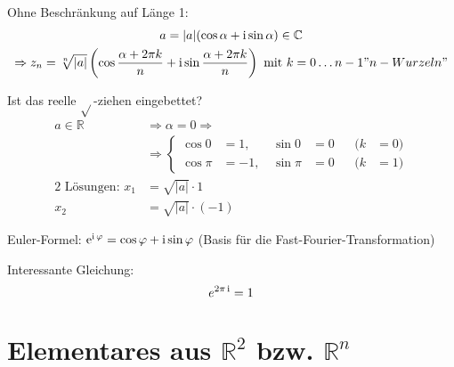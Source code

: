Ohne Beschränkung auf Länge 1:
\begin{gather*}
	a = |a|(\cos \alpha + \operatorname{i} \sin \alpha) \in \mathbb{C} \\
	\Rightarrow z_n = \sqrt[n]{|a|}\left(\cos \frac{\alpha + 2\pi k}{n} + \operatorname{i} \sin \frac{\alpha + 2\pi k}{n}\right) \text{ mit } k = 0\dotsc n - 1 "n-Wurzeln"
\end{gather*}
\begin{note}
	Ist das reelle $\sqrt{}$-ziehen eingebettet?
	\begin{align*}
		a \in \mathbb{R} &\Rightarrow \alpha = 0 \Rightarrow \\
		&\Rightarrow \left\{\begin{aligned}
			\cos 0 &= 1 \text{, } & \sin 0 &= 0 && (k &= 0) \\
			\cos \pi &= -1 \text{, } & \sin \pi &= 0 && (k &= 1)
		\end{aligned}\right. \\
		\text{2 Lösungen: } x_1 &= \sqrt{|a|} \cdot 1 \\
		x_2 &= \sqrt{|a|} \cdot (-1)
	\end{align*}
\end{note}
\begin{note}
	Euler-Formel: $\operatorname{e}^{\operatorname{i} \varphi} =\cos \varphi + \operatorname{i} \sin \varphi$ (Basis für die Fast-Fourier-Transformation)
\end{note}
\begin{note}
	Interessante Gleichung:
	\begin{equation*}
		e^{2\pi\operatorname{i}} = 1
	\end{equation*}
\end{note}

\section{Elementares aus $\mathbb{R}^2$ bzw. $\mathbb{R}^n$}


